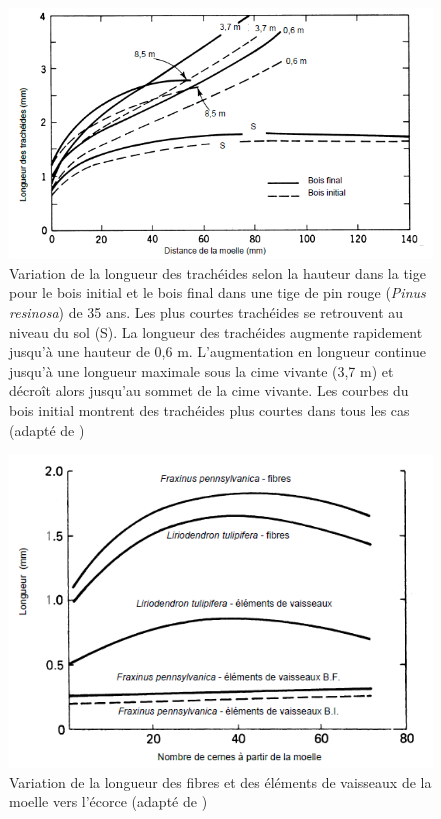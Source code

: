 \begin{figure}[h]
	\centering
	\includegraphics[scale=0.7]{img/ch7_long_haut_resume}
	\caption{Variation de la longueur des trachéides selon la hauteur dans la tige pour le bois initial et le bois final dans une tige de pin rouge (\textit{Pinus resinosa}) de 35 ans. Les plus courtes trachéides se retrouvent au niveau du sol (S). La longueur des trachéides augmente rapidement jusqu'à une hauteur de 0,6 m. L'augmentation en longueur continue jusqu'à une longueur maximale sous la cime vivante (3,7 m) et décroît alors jusqu'au sommet de la cime vivante. Les courbes du bois initial montrent des trachéides plus courtes dans tous les cas (adapté de \cite{panshin1980textbook})}
	\label{fig:long_haut_resume}
\end{figure}

\begin{figure}[h]
	\centering
	\includegraphics[scale=0.7]{img/ch7_long_moelle_feuillus}
	\caption{Variation de la longueur des fibres et des éléments de vaisseaux de la moelle vers l'écorce (adapté de \cite{panshin1980textbook})}
	\label{fig:long_moelle_feuillus}
\end{figure}

